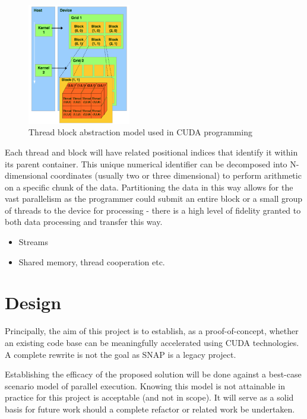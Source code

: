 \documentclass[conference]{IEEEtran}
\begin{document}
\begin{figure}[!h]
    \centering
    \includegraphics[width=0.4\textwidth]{images/grid_block_thread.png}
    \caption{Thread block abstraction model used in CUDA programming}
    \label{fig:gridblockthread}
\end{figure}

Each thread and block will have related positional indices that identify it within its parent container. This unique numerical identifier can be decomposed into N-dimensional coordinates (usually two or three dimensional) to perform arithmetic on a specific chunk of the data. Partitioning the data in this way allows for the vast parallelism as the programmer could submit an entire block or a small group of threads to the device for processing - there is a high level of fidelity granted to both data processing and transfer this way.


\begin{itemize}
    \item Streams
    \item Shared memory, thread cooperation etc.
\end{itemize}


\section{Design}
\label{sec:design}

Principally, the aim of this project is to establish, as a proof-of-concept, whether an existing code base can be meaningfully accelerated using CUDA technologies. A complete rewrite is not the goal as SNAP is a legacy project.

Establishing the efficacy of the proposed solution will be done against a best-case scenario model of parallel execution. Knowing this model is not attainable in practice for this project is acceptable (and not in scope). It will serve as a solid basis for future work should a complete refactor or related work be undertaken.
\end{document}
